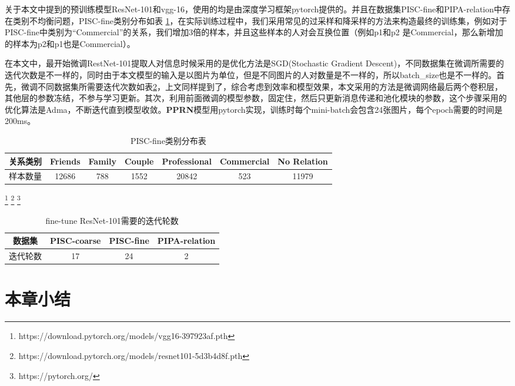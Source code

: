 关于本文中提到的预训练模型ResNet-101和vgg-16，使用的均是由深度学习框架pytorch提供的。并且在数据集PISC-fine和PIPA-relation中存在类别不均衡问题，PISC-fine类别分布如表
\ref{tab:model-pisc-cls}，在实际训练过程中，我们采用常见的过采样和降采样的方法来构造最终的训练集，例如对于PISC-fine中类别为``Commercial''的关系，我们增加3倍的样本，并且这些样本的人对会互换位置（例如p1和p2 是Commercial，那么新增加的样本为p2和p1也是Commercial）。

在本文中，最开始微调RestNet-101提取人对信息时候采用的是优化方法是SGD(Stochastic Gradient Descent)，不同数据集在微调所需要的迭代次数是不一样的，同时由于本文模型的输入是以图片为单位，但是不同图片的人对数量是不一样的，所以batch\_size也是不一样的。首先，微调不同数据集所需要迭代次数如表\ref{tab:model-ft-epoch}，上文同样提到了，综合考虑到效率和模型效果，本文采用的方法是微调网络最后两个卷积层，其他层的参数冻结，不参与学习更新。其次，利用前面微调的模型参数，固定住，然后只更新消息传递和池化模块的参数，这个步骤采用的优化算法是Adma\cite{kingma2014adam}，不断迭代直到模型收敛。\textbf{PPRN}模型用pytorch实现，训练时每个mini-batch会包含24张图片，每个epoch需要的时间是200ms。

\begin{table}[htpb]
  \centering
  \caption{PISC-fine类别分布表}
  \label{tab:model-pisc-cls}
  \begin{tabular}{c|c|c|c|c|c|c}
    \toprule
    关系类别 & Friends & Family & Couple & Professional & Commercial & No Relation \\
    \midrule
    样本数量 & 12686 & 788 & 1552 & 20842 & 523 & 11979 \\
    \bottomrule
  \end{tabular}
\end{table}

\footnote{https://download.pytorch.org/models/vgg16-397923af.pth}
\footnote{https://download.pytorch.org/models/resnet101-5d3b4d8f.pth}
\footnote{https://pytorch.org/}

\begin{table}[htpb]
  \centering
  \caption{fine-tune ResNet-101需要的迭代轮数}
  \label{tab:model-ft-epoch}
  \begin{tabular}{c|c|c|c}
    \toprule
    数据集 & PISC-coarse & PISC-fine  & PIPA-relation \\
    \midrule
    迭代轮数 & 17 & 24 & 2 \\
    \bottomrule
  \end{tabular}
\end{table}

\section{本章小结}

